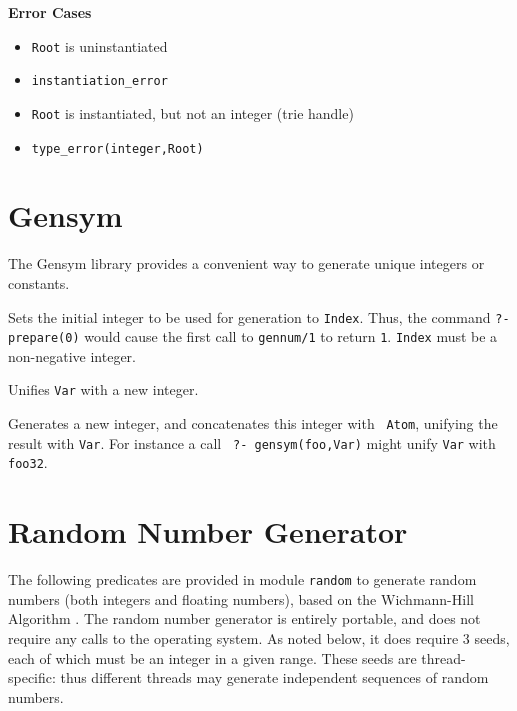 {\begin{description}
{\bf Error Cases}
\begin{itemize}
\item 	{\tt Root} is uninstantiated
\bi
\item 	 {\tt instantiation\_error}
\ei
\item 	{\tt Root} is instantiated, but not an integer (trie handle)
\bi
\item 	 {\tt type\_error(integer,Root)}
\ei
\end{itemize}


\end{description}
}
\section{Gensym}

The Gensym library provides a convenient way to generate unique
integers or constants.  

\begin{description}
 
%
Sets the initial integer to be used for generation to {\tt Index}.
Thus, the command {\tt ?- prepare(0)} would cause the first call to
{\tt gennum/1} to return {\tt 1}.  {\tt Index} must be a non-negative
integer.

 
%
Unifies {\tt Var} with a new integer.

 
%
Generates a new integer, and concatenates this integer with {\tt
Atom}, unifying the result with {\tt Var}.  For instance a call {\tt
?- gensym(foo,Var)} might unify {\tt Var} with {\tt foo32}.
\end{description}

\section{Random Number Generator}

The following predicates are provided in module \texttt{random} to
generate random numbers (both integers and floating numbers), based on
the Wichmann-Hill Algorithm \cite{WicH82,McLe85}.  The random number
generator is entirely portable, and does not require any calls to the
operating system.  As noted below, it does require 3 seeds, each of
which must be an integer in a given range.  These seeds are
thread-specific: thus different threads may generate independent
sequences of random numbers.

